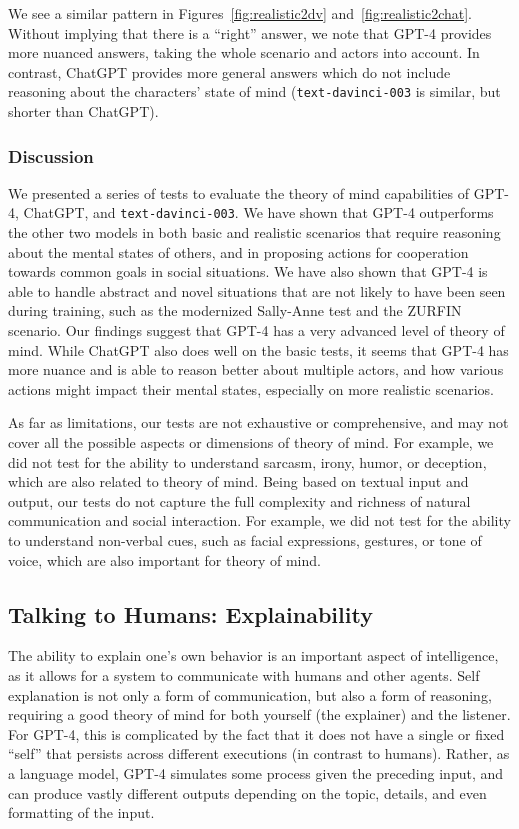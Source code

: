 We see a similar pattern in Figures~\ref{fig:realistic2dv} and~\ref{fig:realistic2chat}. Without implying that there is a ``right'' answer, we note that {GPT-4} provides more nuanced answers, taking the whole scenario and actors into account. In contrast, ChatGPT provides more general answers which do not include reasoning about the characters' state of mind (\texttt{text-davinci-003} is similar, but shorter than ChatGPT).

\subsubsection{Discussion}
We presented a series of tests to evaluate the theory of mind capabilities of GPT-4, ChatGPT, and \texttt{text-davinci-003}. We have shown that GPT-4 outperforms the other two models in both basic and realistic scenarios that require reasoning about the mental states of others, and in proposing actions for cooperation towards common goals in social situations. We have also shown that GPT-4 is able to handle abstract and novel situations that are not likely to have been seen during training, such as the modernized Sally-Anne test and the ZURFIN scenario. Our findings suggest that GPT-4 has a very advanced level of theory of mind. While ChatGPT also does well on the basic tests, it seems that GPT-4 has more nuance and is able to reason better about multiple actors, and how various actions might impact their mental states, especially on more realistic scenarios.

As far as limitations, our tests are not exhaustive or comprehensive, and may not cover all the possible aspects or dimensions of theory of mind. For example, we did not test for the ability to understand sarcasm, irony, humor, or deception, which are also related to theory of mind. Being based on textual input and output, our tests do not capture the full complexity and richness of natural communication and social interaction. For example, we did not test for the ability to understand non-verbal cues, such as facial expressions, gestures, or tone of voice, which are also important for theory of mind.

\subsection{Talking to Humans: Explainability} \label{sec:explainability}
The ability to explain one's own behavior is an important aspect of intelligence, as it allows for a system to communicate with humans and other agents. Self explanation is not only a form of communication, but also a form of reasoning, requiring a good theory of mind for both yourself (the explainer) and the listener. For {GPT-4}, this is complicated by the fact that it does not have a single or fixed ``self'' that persists across different executions (in contrast to humans). Rather, as a language model, {GPT-4} simulates some process given the preceding input, and can produce vastly different outputs depending on the topic, details, and even formatting of the input.

